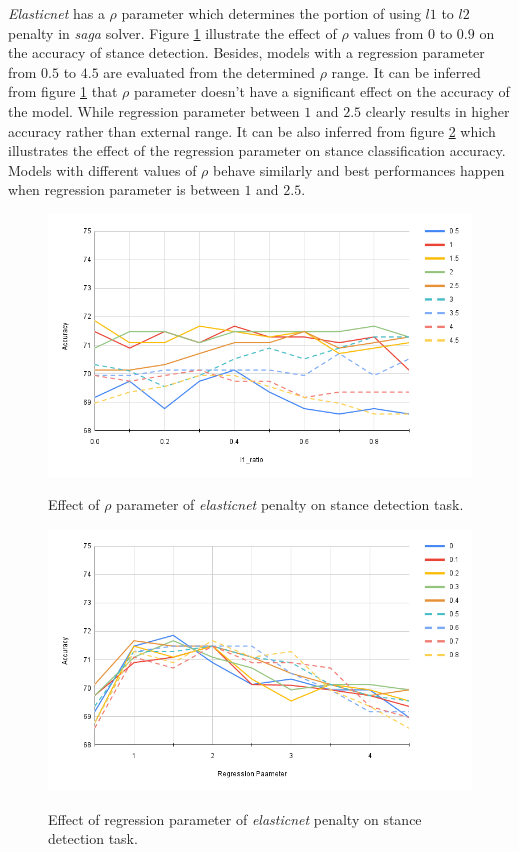 \textit{Elasticnet} has a $\rho$ parameter which determines the portion of using $l1$ to $l2$ penalty in \textit{saga} solver. Figure \ref{fig:logistic1} illustrate the effect of $\rho$ values from $0$ to $0.9$ on the accuracy of stance detection. Besides, models with a regression parameter from $0.5$ to $4.5$ are evaluated from the determined $\rho$ range. It can be inferred from figure \ref{fig:logistic1} that $\rho$ parameter doesn't have a significant effect on the accuracy of the model. While regression parameter between $1$ and $2.5$ clearly results in higher accuracy rather than external range. It can be also inferred from figure \ref{fig:logistic2} which illustrates the effect of the regression parameter on stance classification accuracy. Models with different values of $\rho$ behave similarly and best performances happen when regression parameter is between $1$ and $2.5$.  
\begin{figure}%
	\centering
	{\includegraphics[width=12.5cm]{statistics/logistic_elastic1.png} }
	\caption{Effect of $\rho$ parameter of \textit{elasticnet} penalty on stance detection task.}%
	\label{fig:logistic1}%
\end{figure}
\begin{figure}%
	\centering
	{\includegraphics[width=12.5cm]{statistics/logistic_elastic2.png} }
	\caption{Effect of regression parameter of \textit{elasticnet} penalty on stance detection task.}%
	\label{fig:logistic2}%
\end{figure}

